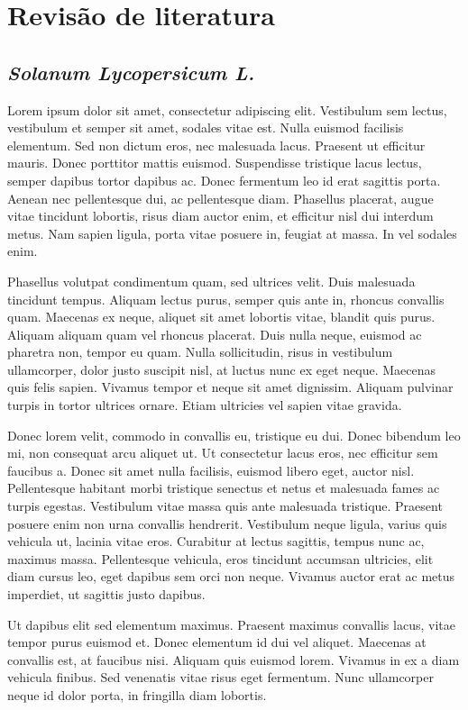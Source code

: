 
\chapter{Revisão de literatura}

\section{\emph{Solanum Lycopersicum L.}}
Lorem ipsum dolor sit amet, consectetur adipiscing elit. Vestibulum sem lectus, vestibulum et semper sit amet, sodales vitae est. Nulla euismod facilisis elementum. Sed non dictum eros, nec malesuada lacus. Praesent ut efficitur mauris. Donec porttitor mattis euismod. Suspendisse tristique lacus lectus, semper dapibus tortor dapibus ac. Donec fermentum leo id erat sagittis porta. Aenean nec pellentesque dui, ac pellentesque diam. Phasellus placerat, augue vitae tincidunt lobortis, risus diam auctor enim, et efficitur nisl dui interdum metus. Nam sapien ligula, porta vitae posuere in, feugiat at massa. In vel sodales enim.

Phasellus volutpat condimentum quam, sed ultrices velit. Duis malesuada tincidunt tempus. Aliquam lectus purus, semper quis ante in, rhoncus convallis quam. Maecenas ex neque, aliquet sit amet lobortis vitae, blandit quis purus. Aliquam aliquam quam vel rhoncus placerat. Duis nulla neque, euismod ac pharetra non, tempor eu quam. Nulla sollicitudin, risus in vestibulum ullamcorper, dolor justo suscipit nisl, at luctus nunc ex eget neque. Maecenas quis felis sapien. Vivamus tempor et neque sit amet dignissim. Aliquam pulvinar turpis in tortor ultrices ornare. Etiam ultricies vel sapien vitae gravida.

Donec lorem velit, commodo in convallis eu, tristique eu dui. Donec bibendum leo mi, non consequat arcu aliquet ut. Ut consectetur lacus eros, nec efficitur sem faucibus a. Donec sit amet nulla facilisis, euismod libero eget, auctor nisl. Pellentesque habitant morbi tristique senectus et netus et malesuada fames ac turpis egestas. Vestibulum vitae massa quis ante malesuada tristique. Praesent posuere enim non urna convallis hendrerit. Vestibulum neque ligula, varius quis vehicula ut, lacinia vitae eros. Curabitur at lectus sagittis, tempus nunc ac, maximus massa. Pellentesque vehicula, eros tincidunt accumsan ultricies, elit diam cursus leo, eget dapibus sem orci non neque. Vivamus auctor erat ac metus imperdiet, ut sagittis justo dapibus.

Ut dapibus elit sed elementum maximus. Praesent maximus convallis lacus, vitae tempor purus euismod et. Donec elementum id dui vel aliquet. Maecenas at convallis est, at faucibus nisi. Aliquam quis euismod lorem. Vivamus in ex a diam vehicula finibus. Sed venenatis vitae risus eget fermentum. Nunc ullamcorper neque id dolor porta, in fringilla diam lobortis.

